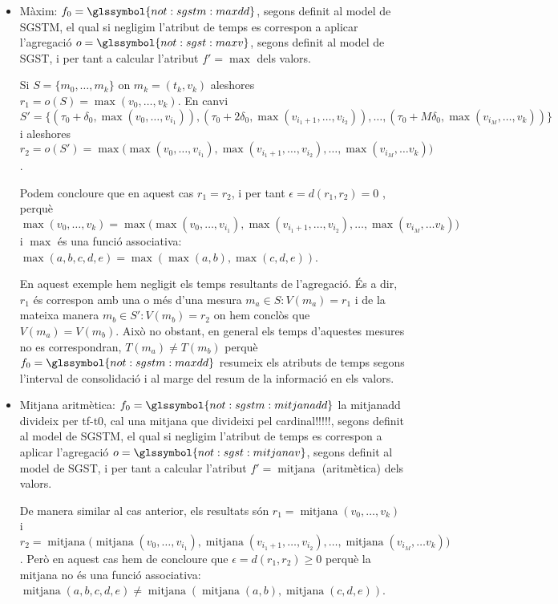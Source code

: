   \begin{itemize}
  \item Màxim: $f_0=\glssymbol{not:sgstm:maxdd}$, segons definit al
    model de \gls{SGSTM}, el qual si negligim l'atribut de temps es
    correspon a aplicar l'agregació $o=\glssymbol{not:sgst:maxv}$,
    segons definit al model de \gls{SGST}, i per tant a calcular
    l'atribut $f'=\max$ dels valors.

    Si $S=\{m_0,\dotsc,m_k\}$ on $m_k=(t_k,v_k)$ aleshores
    $r_1=o(S)=\max(v_0,\dotsc, v_k)$. En canvi $S'=\{
    (\tau_0+\delta_0, \max(v_0,\dotsc,v_{i_1})),
    (\tau_0+2\delta_0,\max(v_{i_1+1},\dotsc,v_{i_2})), \dotsc,
    (\tau_0+M\delta_0,\max(v_{i_M}, \dotsc, v_k)) \}$ i aleshores
    $r_2=o(S')= \max\big( \max(v_0,\dotsc,v_{i_1}),
    \max(v_{i_1+1},\dotsc,v_{i_2}), \dotsc, \max(v_{i_M}, \dotsc v_k)
    \big)$.

    Podem concloure que en aquest cas $r_1=r_2$, i per tant
    $\epsilon=d(r_1,r_2)=0$ , perquè $\max(v_0,\dotsc, v_k) =
    \max\big( \max(v_0,\dotsc,v_{i_1}),
    \max(v_{i_1+1},\dotsc,v_{i_2}), \dotsc, \max(v_{i_M}, \dotsc v_k)
    \big)$ i $\max$ és una funció associativa: $\max(a,b,c,d,e) = \max(
    \max(a,b), \max(c,d,e))$.

    En aquest exemple hem negligit els temps resultants de
    l'agregació. És a dir, $r_1$ és correspon amb una o més d'una
    mesura $m_a\in S: V(m_a)=r_1$ i de la mateixa manera $m_b\in S':
    V(m_b)=r_2$ on hem conclòs que $V(m_a)=V(m_b)$. Això no obstant,
    en general els temps d'aquestes mesures no es correspondran,
    $T(m_a)\neq T(m_b)$ perquè $f_0=\glssymbol{not:sgstm:maxdd}$
    resumeix els atributs de temps segons l'interval de consolidació i
    al marge del resum de la informació en els valors.



\item   Mitjana aritmètica:
  $f_0=\glssymbol{not:sgstm:mitjanadd}$ la mitjanadd
  divideix per tf-t0, cal una mitjana que divideixi pel
  cardinal!!!!!, segons definit al model de
  \gls{SGSTM}, el qual si negligim l'atribut de temps es correspon a
  aplicar l'agregació $o=\glssymbol{not:sgst:mitjanav}$, segons
  definit al model de \gls{SGST}, i per tant a calcular l'atribut
  $f'=\operatorname{mitjana}$ (aritmètica) dels valors.

    De manera similar al cas anterior, els resultats són
    $r_1=\operatorname{mitjana}(v_0,\dotsc, v_k)$ i
    $r_2=\operatorname{mitjana}\big(
    \operatorname{mitjana}(v_0,\dotsc,v_{i_1}),
    \operatorname{mitjana}(v_{i_1+1},\dotsc,v_{i_2}), \dotsc,
    \operatorname{mitjana}(v_{i_M}, \dotsc v_k) \big)$.  Però en
    aquest cas hem de concloure que $\epsilon=d(r_1,r_2)\geq 0$ perquè
    la mitjana no és una funció associativa:
    $\operatorname{mitjana}(a,b,c,d,e) \neq \operatorname{mitjana}(
    \operatorname{mitjana}(a,b), \operatorname{mitjana}(c,d,e))$.
 



\end{itemize}
